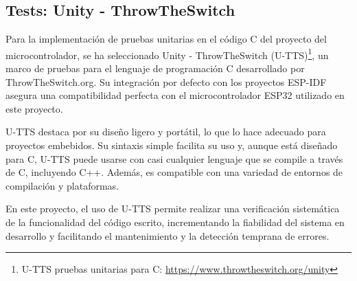 \subsection{Tests: Unity - ThrowTheSwitch}

Para la implementación de pruebas unitarias en el código C del proyecto del microcontrolador, se ha seleccionado Unity - ThrowTheSwitch (U-TTS)\footnote{U-TTS pruebas unitarias para C: \url{https://www.throwtheswitch.org/unity}}, un marco de pruebas para el lenguaje de programación C desarrollado por ThrowTheSwitch.org. Su integración por defecto con los proyectos ESP-IDF asegura una compatibilidad perfecta con el microcontrolador ESP32 utilizado en este proyecto.



U-TTS destaca por su diseño ligero y portátil, lo que lo hace adecuado para proyectos embebidos. Su sintaxis simple facilita su uso y, aunque está diseñado para C, U-TTS puede usarse con casi cualquier lenguaje que se compile a través de C, incluyendo C++. Además, es compatible con una variedad de entornos de compilación y plataformas.



En este proyecto, el uso de U-TTS permite realizar una verificación sistemática de la funcionalidad del código escrito, incrementando la fiabilidad del sistema en desarrollo y facilitando el mantenimiento y la detección temprana de errores.